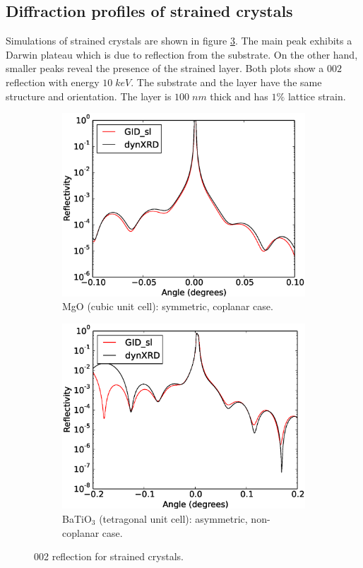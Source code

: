 \documentclass[12pt,oneside,notitlepage,abstracton,a4paper]{scrartcl}
\begin{document}
\newpage
\subsection{Diffraction profiles of strained crystals}\label{res2}

Simulations of strained crystals are shown in figure \ref{testsstrain}. The main peak exhibits a Darwin plateau which is due to reflection from the substrate. On the other hand, smaller peaks reveal the presence of the strained layer. Both plots show a $002$ reflection with energy $10\; keV$. The substrate and the layer have the same structure and orientation. The layer is $100\; nm$ thick and has $1\%$ lattice strain.
\begin{figure}[h]
 \centering
 \begin{subfigure}[h]{0.49\textwidth}
  \includegraphics[width=\textwidth]{pics/test12.eps}
  \caption{MgO (cubic unit cell): symmetric, coplanar case.}\label{test12}
  \label{test12}
 \end{subfigure}
 \begin{subfigure}[h]{0.49\textwidth}
  \includegraphics[width=\textwidth]{pics/test14.eps}
  \caption{BaTiO$ _3$ (tetragonal unit cell): asymmetric, non-coplanar case.}\label{test14}
  \label{test14}
 \end{subfigure}
 \caption{002 reflection for strained crystals.}\label{testsstrain}
\end{figure}
\end{document}
